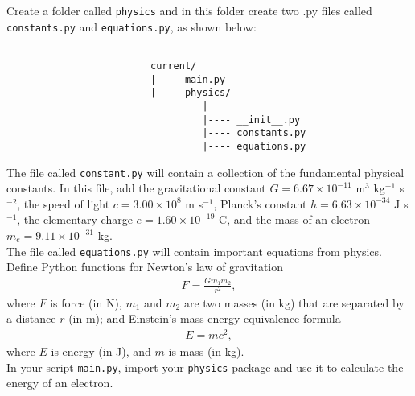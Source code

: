 \documentclass[11pt]{report}
\begin{document}
\begin{Exercise}[title=Creating a physics package (Essential)]\label{Ex:package}

Create a folder  called {\tt physics} and in this folder create two .py files called
{\tt constants.py} and {\tt equations.py}, as shown below:
\begin{verbatim}

                         current/
                         |---- main.py
                         |---- physics/
                                  |
                                  |---- __init__.py
                                  |---- constants.py
                                  |---- equations.py
\end{verbatim}

The file called {\tt constant.py} will contain a collection of the fundamental
physical constants.  In this file, add the gravitational constant
$G = 6.67 \times 10^{-11}$ m$^3$ kg$^{-1}$ s$^{-2}$,
the speed of light $c = 3.00 \times 10^{8}$ m s$^{-1}$,
Planck's constant $h = 6.63 \times 10^{-34}$ J s$^{-1}$,
the elementary charge $e = 1.60 \times 10^{-19}$ C,
and the mass of an electron $m_e = 9.11 \times 10^{-31}$ kg.
\\[1em]
The file called {\tt equations.py} will contain important equations
from physics.  Define Python functions for 
Newton's law of gravitation
\begin{align}
F = \frac{G m_1 m_2}{r^2},
\end{align}
where $F$ is force (in N), $m_1$ and $m_2$ are two masses (in kg) that are separated by
a distance $r$ (in m); and Einstein's mass-energy equivalence formula
\begin{align}
E = m c^2,
\end{align}
where $E$ is energy (in J), and $m$ is mass (in kg).  
\\[1em]
In your script {\tt main.py}, import your {\tt physics} package and use it to
calculate the energy of an electron.

\end{Exercise}

%
%
\end{document}
